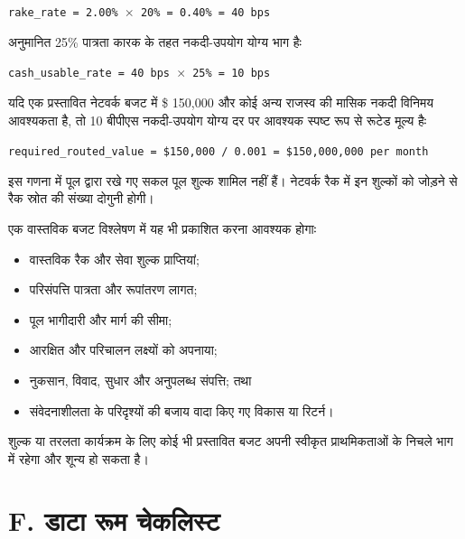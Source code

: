 \documentclass[11pt]{article}
\begin{document}
\texttt{rake\_rate = 2.00\% $\times$ 20\% = 0.40\% = 40 bps}

अनुमानित 25\% पात्रता कारक के तहत नकदी-उपयोग योग्य भाग हैः

\texttt{cash\_usable\_rate = 40 bps $\times$ 25\% = 10 bps}

यदि एक प्रस्तावित नेटवर्क बजट में \$ 150,000 और कोई अन्य राजस्व की मासिक नकदी विनिमय आवश्यकता है, तो 10 बीपीएस नकदी-उपयोग योग्य दर पर आवश्यक स्पष्ट रूप से रूटेड मूल्य हैः

\texttt{required\_routed\_value = \$150,000 / 0.001 = \$150,000,000 per month}

इस गणना में पूल द्वारा रखे गए सकल पूल शुल्क शामिल नहीं हैं। नेटवर्क रैक में इन शुल्कों को जोड़ने से रैक स्रोत की संख्या दोगुनी होगी।

एक वास्तविक बजट विश्लेषण में यह भी प्रकाशित करना आवश्यक होगाः

\begin{itemize}[leftmargin=*]
\item वास्तविक रैक और सेवा शुल्क प्राप्तियां;
\item परिसंपत्ति पात्रता और रूपांतरण लागत;
\item पूल भागीदारी और मार्ग की सीमा;
\item आरक्षित और परिचालन लक्ष्यों को अपनाया;
\item नुकसान, विवाद, सुधार और अनुपलब्ध संपत्ति; तथा
\item संवेदनाशीलता के परिदृश्यों की बजाय वादा किए गए विकास या रिटर्न।
\end{itemize}
शुल्क या तरलता कार्यक्रम के लिए कोई भी प्रस्तावित बजट अपनी स्वीकृत प्राथमिकताओं के निचले भाग में रहेगा और शून्य हो सकता है।


\section*{F. डाटा रूम चेकलिस्ट}
\end{document}
